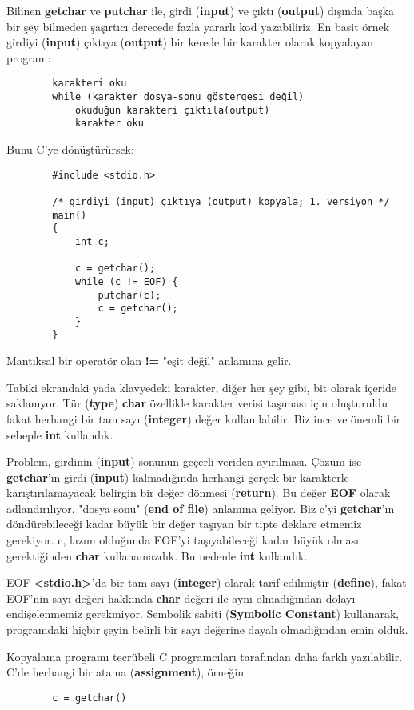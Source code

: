 \documentclass[a4paper,12pt,oneside]{book}
\begin{document}
Bilinen \textbf{getchar} ve \textbf{putchar} ile, girdi (\textbf{input}) ve çıktı (\textbf{output}) dışında başka bir şey bilmeden şaşırtıcı derecede fazla yararlı kod yazabiliriz. En basit örnek girdiyi (\textbf{input}) çıktıya (\textbf{output}) bir kerede bir karakter olarak kopyalayan program:
\begin{lstlisting}
		karakteri oku
		while (karakter dosya-sonu göstergesi değil)
			okuduğun karakteri çıktıla(output)
			karakter oku
\end{lstlisting}
Bunu C'ye dönüştürürsek:
\begin{lstlisting}
		#include <stdio.h>

		/* girdiyi (input) çıktıya (output) kopyala; 1. versiyon */
		main()
		{
			int c;

			c = getchar();
			while (c != EOF) {
				putchar(c);
				c = getchar();
			}
		}
\end{lstlisting}
Mantıksal bir operatör olan \textbf{ !=} "eşit değil" anlamına gelir.
\par Tabiki ekrandaki yada klavyedeki karakter, diğer her şey gibi, bit olarak içeride saklanıyor. Tür (\textbf{type}) \textbf{char} özellikle karakter verisi taşıması için oluşturuldu fakat herhangi bir tam sayı (\textbf{integer}) değer kullanılabilir. Biz ince ve önemli bir sebeple \textbf{int} kullandık.
\par Problem, girdinin (\textbf{input}) sonunun geçerli veriden ayırılması. Çözüm ise \textbf{getchar}'ın girdi (\textbf{input}) kalmadığında herhangi gerçek bir karakterle karıştırılamayacak belirgin bir değer dönmesi (\textbf{return}). Bu değer \textbf{EOF} olarak adlandırılıyor, "dosya sonu" (\textbf{end of file}) anlamına geliyor. Biz c'yi \textbf{getchar}'ın döndürebileceği kadar büyük bir değer taşıyan bir tipte deklare etmemiz gerekiyor. c, lazım olduğunda EOF'yi taşıyabileceği kadar büyük olması gerektiğinden \textbf{char} kullanamazdık. Bu nedenle \textbf{int} kullandık.
\par EOF \textbf{<stdio.h>}'da bir tam sayı (\textbf{integer}) olarak tarif edilmiştir (\textbf{define}), fakat EOF'nin sayı değeri hakkında \textbf{char} değeri ile aynı olmadığından dolayı endişelenmemiz gerekmiyor. Sembolik sabiti (\textbf{Symbolic Constant}) kullanarak, programdaki hiçbir şeyin belirli bir sayı değerine dayalı olmadığından emin olduk.
\par Kopyalama programı tecrübeli C programcıları tarafından daha farklı yazılabilir. C'de herhangi bir atama (\textbf{assignment}), örneğin
\begin{lstlisting}
		c = getchar()
\end{lstlisting}
\end{document}
